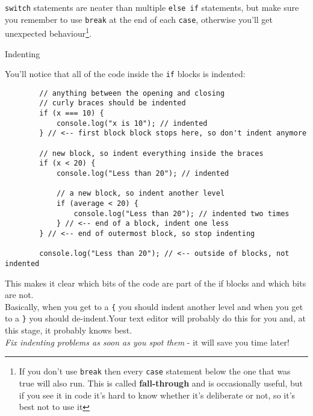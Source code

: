 \texttt{switch} statements are neater than multiple \texttt{else if} statements, but make sure you remember to use \texttt{break} at the end of each \texttt{case}, otherwise you'll get unexpected behaviour\footnote{If you don't use \texttt{break} then every \texttt{case} statement below the one that was true will also run. This is called \textbf{fall-through} and is occasionally useful, but if you see it in code it's hard to know whether it's deliberate or not, so it's best not to use it}.

\pagebreak

\begin{infobox}{Indenting}

    You'll notice that all of the code inside the \texttt{if} blocks is indented:

    \begin{verbatim}
        // anything between the opening and closing
        // curly braces should be indented
        if (x === 10) {
            console.log("x is 10"); // indented
        } // <-- first block block stops here, so don't indent anymore

        // new block, so indent everything inside the braces
        if (x < 20) {
            console.log("Less than 20"); // indented

            // a new block, so indent another level
            if (average < 20) {
                console.log("Less than 20"); // indented two times
            } // <-- end of a block, indent one less
        } // <-- end of outermost block, so stop indenting

        console.log("Less than 20"); // <-- outside of blocks, not indented
    \end{verbatim}

    This makes it clear which bits of the code are part of the if blocks and which bits are not.
    \\

    Basically, when you get to a \texttt{\{} you should indent another level and when you get to a \texttt{\}} you should de-indent.\footnotemark Your text editor will probably do this for you and, at this stage, it probably knows best.
    \\

    \textit{Fix indenting problems as soon as you spot them} - it will save you time later!
\end{infobox}



